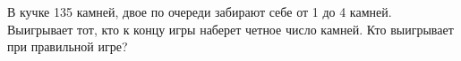 \begin{problem}
В кучке 135 камней, двое по очереди забирают себе от 1 до 4 камней. Выигрывает тот, кто к концу игры наберет четное число камней. Кто выигрывает при правильной игре?\par

\begin{sol}
\end{sol}
\end{problem}















